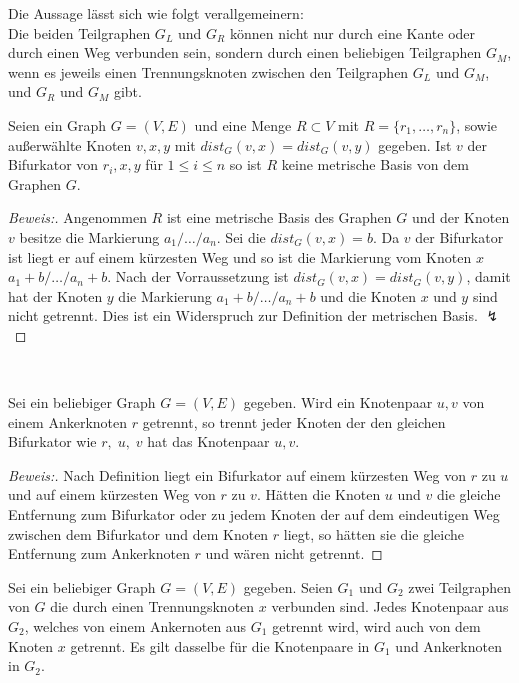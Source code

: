   \begin{bem}
  \label{aussagetrennungsgraphen}
  Die Aussage lässt sich wie folgt verallgemeinern:\\
  Die beiden Teilgraphen $G_L$ und $G_R$ können nicht nur durch eine Kante oder durch einen Weg verbunden sein, sondern durch einen beliebigen Teilgraphen $G_M$, wenn es jeweils einen Trennungsknoten zwischen den Teilgraphen $G_L$ und $G_M$, und $G_R$ und $G_M$ gibt.
  \end{bem}
\begin{lem}
\label{Bifurnachbar}
Seien ein Graph $G=(V,E)$ und eine Menge $R \subset V$ mit $R=\{r_1, \ldots , r_n\}$, sowie außerwählte Knoten $v,x,y$ mit $dist_G(v,x)=dist_G(v,y)$ gegeben. Ist $v$ der Bifurkator von $r_i,x,y$ für $1 \leq i \leq n$ so ist $R$ keine metrische Basis von dem Graphen $G$.
\end{lem}
\begin{proof}[Beweis:]
Angenommen $R$ ist eine metrische Basis des Graphen $G$ und der Knoten $v$ besitze die Markierung $a_1/\ldots /a_n$. Sei die $dist_G(v,x)=b$. Da $v$ der Bifurkator ist liegt er auf einem kürzesten Weg und so ist die Markierung vom Knoten $x$ $a_1+b/\ldots /a_n+b$. Nach der Vorraussetzung ist $dist_G(v,x)=dist_G(v,y)$, damit hat der Knoten $y$ die Markierung $a_1+b/\ldots /a_n+b$ und die Knoten $x$ und $y$ sind nicht getrennt. Dies ist ein Widerspruch zur Definition der metrischen Basis. $\lightning$
\end{proof}
~ \linebreak
\vspace{-12mm}
\begin{lem}
\label{bifur}
Sei ein beliebiger Graph $G=(V,E)$ gegeben. Wird ein Knotenpaar $u,v$ von einem Ankerknoten $r$ getrennt, so trennt jeder Knoten der den gleichen Bifurkator wie $r,\;u,\;v$ hat das Knotenpaar $u,v$.
\end{lem}
\begin{proof}[Beweis:]
Nach Definition liegt ein Bifurkator auf einem kürzesten Weg von $r$ zu $u$ und auf einem kürzesten Weg von $r$ zu $v$. Hätten die Knoten $u$ und $v$ die gleiche Entfernung zum Bifurkator oder zu jedem Knoten der auf dem eindeutigen Weg zwischen dem Bifurkator und dem Knoten $r$ liegt, so hätten sie die gleiche Entfernung zum Ankerknoten $r$ und wären nicht getrennt.
\end{proof}
\begin{lem}
\label{trennungsknoten}
Sei ein beliebiger Graph $G=(V,E)$ gegeben. Seien $G_1$ und $G_2$ zwei Teilgraphen von $G$ die durch einen Trennungsknoten $x$ verbunden sind. Jedes Knotenpaar aus $G_2$, welches von einem Ankernoten aus $G_1$ getrennt wird, wird auch von dem Knoten $x$ getrennt. Es gilt dasselbe für die Knotenpaare in $G_1$ und Ankerknoten in $G_2$.
\end{lem}
